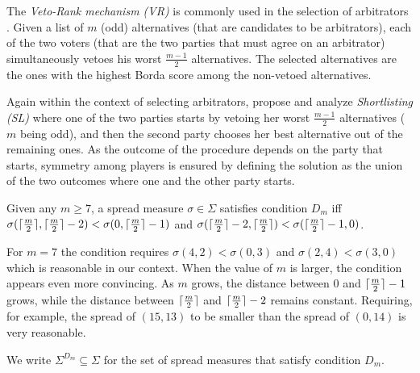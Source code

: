 \documentclass[pagesize, twoside=off, bibliography=totoc, DIV=calc, fontsize=12pt, a4paper]{scrartcl}
\begin{document}
The \textit{Veto-Rank mechanism (VR)} is commonly used in the selection of arbitrators \citep{Clippel2014}. Given a list of $m$ (odd) alternatives (that are candidates to be arbitrators), each of the two voters (that are the two parties that must agree on an arbitrator) simultaneously vetoes his worst $\frac{m-1}{2}$ alternatives. The selected alternatives are the ones with the highest Borda score among the non-vetoed alternatives.

Again within the context of selecting arbitrators, \citet{Clippel2014} propose and analyze \textit{Shortlisting (SL)} where one of the two parties starts by vetoing her worst $\frac{m-1}{2}$ alternatives ($m$ being odd), and then the second party chooses her best alternative out of the remaining ones. As the outcome of the procedure depends on the party that starts, symmetry among players is ensured by defining the solution as the union of the two outcomes where one and the other party starts.

\begin{definition}
	Given any $m \geq 7$, a spread measure $\sigma \in \Sigma$ satisfies condition $D_m$ iff 
	$\sigma(\lceil\frac{m}{2}\rceil, \lceil\frac{m}{2}\rceil - 2) < \sigma(0, \lceil\frac{m}{2}\rceil - 1)$ and 
	$\sigma(\lceil\frac{m}{2}\rceil - 2, \lceil\frac{m}{2}\rceil) < \sigma(\lceil\frac{m}{2}\rceil - 1, 0)$.
\end{definition}

For $m=7$ the condition requires $\sigma(4, 2) < \sigma(0, 3)$ and $\sigma(2, 4) < \sigma(3, 0)$ which is reasonable in our context. When the value of $m$ is larger, the condition appears even more convincing. As $m$ grows, the distance between $0$ and $\lceil\frac{m}{2}\rceil - 1$ grows, while the distance between $\lceil\frac{m}{2}\rceil$ and $\lceil\frac{m}{2}\rceil - 2$ remains constant. Requiring, for example, the spread of $(15, 13)$ to be smaller than the spread of $(0, 14)$ is very reasonable.

We write $\Sigma^{D_{m}} \subseteq \Sigma$ for the set of spread measures that satisfy condition $D_{m}$. 
\end{document}
